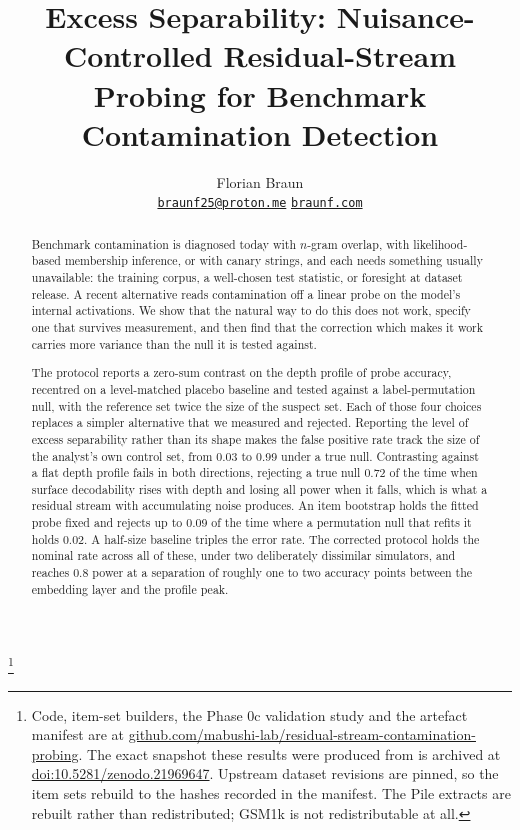 \documentclass[10pt,twocolumn,letterpaper]{article}
\title{\bf Excess Separability: Nuisance-Controlled Residual-Stream\\ Probing for Benchmark Contamination Detection}
\author{Florian Braun \\
  \texttt{\href{mailto:braunf25@proton.me}{braunf25@proton.me}} \quad
  \texttt{\href{https://braunf.com/}{braunf.com}}}
\date{}
\newcommand\blfootnote[1]{%
  \begingroup
  \renewcommand\thefootnote{}\footnote{#1}%
  \addtocounter{footnote}{-1}%
  \endgroup}
\begin{document}
\maketitle

\blfootnote{Code, item-set builders, the Phase 0c validation study and the
artefact manifest are at
\href{https://github.com/mabushi-lab/residual-stream-contamination-probing}%
{github.com/mabushi-lab/residual-stream-contamination-probing}. The exact
snapshot these results were produced from is archived at
\href{https://doi.org/10.5281/zenodo.21969647}{doi:10.5281/zenodo.21969647}.
Upstream dataset revisions are pinned, so the item sets rebuild to the hashes
recorded in the manifest. The Pile extracts are rebuilt rather than
redistributed; GSM1k is not redistributable at all.}

\begin{abstract}
\noindent
Benchmark contamination is diagnosed today with $n$-gram overlap, with
likelihood-based membership inference, or with canary strings, and each needs
something usually unavailable: the training corpus, a well-chosen test
statistic, or foresight at dataset release. A recent alternative reads
contamination off a linear probe on the model's internal activations. We show
that the natural way to do this does not work, specify one that survives
measurement, and then find that the correction which makes it work carries
more variance than the null it is tested against.

The protocol reports a zero-sum contrast on the depth profile of probe
accuracy, recentred on a level-matched placebo baseline and tested against a
label-permutation null, with the reference set twice the size of the suspect
set. Each of those four choices replaces a simpler alternative that we measured
and rejected. Reporting the level of excess separability rather than its shape
makes the false positive rate track the size of the analyst's own control set,
from 0.03 to 0.99 under a true null. Contrasting against a flat depth profile
fails in both directions, rejecting a true null 0.72 of the time when surface
decodability rises with depth and losing all power when it falls, which is what
a residual stream with accumulating noise produces. An item bootstrap holds the
fitted probe fixed and rejects up to 0.09 of the time where a permutation null
that refits it holds 0.02. A half-size baseline triples the error rate. The corrected protocol holds the nominal rate across
all of these, under two deliberately dissimilar simulators, and reaches 0.8
power at a separation of roughly one to two accuracy points between the
embedding layer and the profile peak.


\end{abstract}
\end{document}
